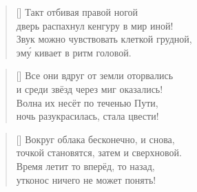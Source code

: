 \documentclass[a5paper,11pt]{memoir}
\begin{document}
\begin{verse}[\versewidth]
Такт отбивая правой ногой\\
дверь распахнул кенгуру в мир иной!\\
Звук можно чувствовать клеткой грудной,\\
эм\'{у} кивает в ритм головой.
\end{verse}

\begin{verse}[\versewidth]
Все они вдруг от земли оторвались\\
и среди звёзд через миг оказались!\\
Волна их несёт по теченью Пути,\\
ночь разукрасилась, стала цвести!
\end{verse}

\newpage

\begin{verse}[\versewidth]
\hspace{-3cm}Вокруг облака бесконечно, и снова,\\
\hspace{-3cm}точкой становятся, затем и сверхновой.\\
\hspace{-3cm}Время летит то вперёд, то назад,\\
\hspace{-3cm}утконос ничего не может понять!
\end{verse}

\BgThispage
\end{document}
